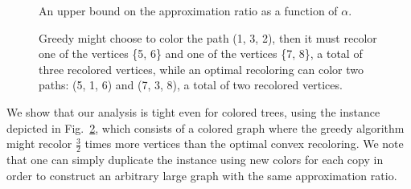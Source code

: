 \begin{figure}
\centering
{}
\caption{
\label{fig:upper_bound}
An upper bound on the approximation ratio as a function of $\alpha$.
}
\end{figure}

\begin{figure}
\centering
{}
\caption{
Greedy might choose to color the path (1, 3, 2), 
then it must recolor one of the vertices \{5, 6\} 
and one of the vertices \{7, 8\}, 
a total of three recolored vertices, 
while an optimal recoloring can color two paths: (5, 1, 6) and (7, 3, 8), 
a total of two recolored vertices.}
\label{fig:tight}
\end{figure}

We show that our analysis is tight even for colored trees, using the
instance depicted in Fig.~\ref{fig:tight}, 
which consists of a colored graph where the greedy algorithm might recolor
$\frac{3}{2}$ times more vertices than the optimal convex recoloring.
%
We note that one can simply duplicate the instance using new colors for
each copy in order to construct an arbitrary large graph with the same
approximation ratio.